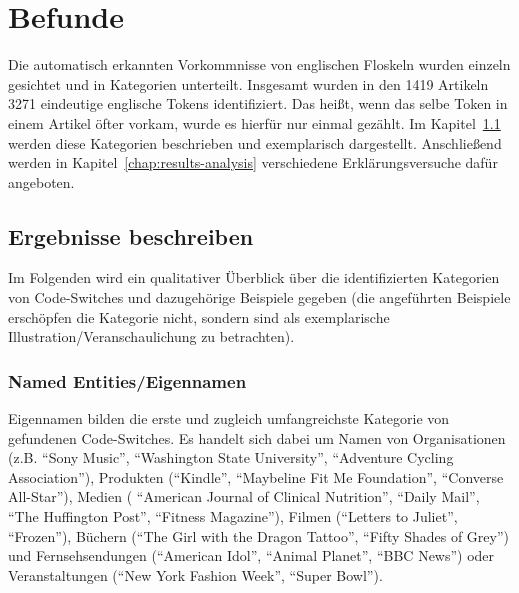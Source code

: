 \section{Befunde}


Die automatisch erkannten Vorkommnisse von englischen Floskeln wurden einzeln gesichtet und in Kategorien unterteilt.
Insgesamt wurden in den 1419 Artikeln 3271 eindeutige englische Tokens identifiziert. %
Das heißt, wenn das selbe Token in einem Artikel öfter vorkam, wurde es hierfür nur einmal gezählt.
Im Kapitel~\ref{chap:results-desc} werden diese Kategorien beschrieben und exemplarisch dargestellt.
Anschließend werden in Kapitel~\ref{chap:results-analysis} verschiedene Erklärungsversuche dafür angeboten.


\subsection{Ergebnisse beschreiben}
\label{chap:results-desc}

Im Folgenden wird ein qualitativer Überblick über die identifizierten Kategorien von Code-Switches und dazugehörige Beispiele gegeben (die angeführten Beispiele erschöpfen die Kategorie nicht, sondern sind als exemplarische Illustration/Veranschaulichung zu betrachten).

\subsubsection{Named Entities/Eigennamen}
Eigennamen bilden die erste und zugleich umfangreichste Kategorie von gefundenen Code-Switches.
Es handelt sich dabei um Namen von Organisationen (z.B. ``Sony Music'', ``Washington State University'', ``Adventure Cycling Association''),
Produkten (``Kindle'', ``Maybeline Fit Me Foundation'', ``Converse All-Star''),
Medien ( ``American Journal of Clinical Nutrition'', ``Daily Mail'', ``The Huffington Post'', ``Fitness Magazine''),
Filmen (``Letters to Juliet'', ``Frozen''),
Büchern (``The Girl with the Dragon Tattoo'', ``Fifty Shades of Grey'')
und Fernsehsendungen (``American Idol'', ``Animal Planet'', ``BBC News'')
oder Veranstaltungen (``New York Fashion Week'', ``Super Bowl'').

